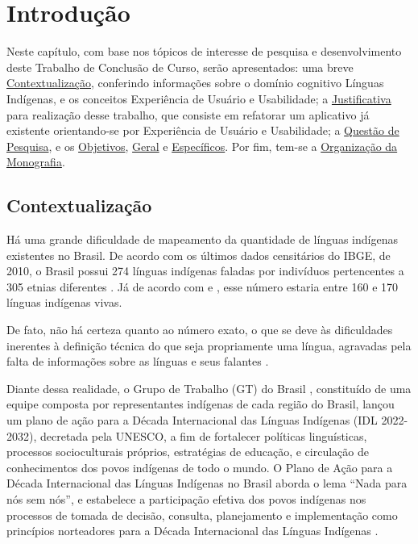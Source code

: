 \chapter[Introdução]{Introdução}

Neste capítulo, com base nos tópicos de interesse de pesquisa e desenvolvimento deste Trabalho de Conclusão de Curso, serão apresentados: uma breve
\hyperref[sec:Contextualização]{Contextualização}, conferindo informações sobre o domínio cognitivo Línguas Indígenas, e os conceitos Experiência de Usuário e
Usabilidade; a \hyperref[sec:Justificativa]{Justificativa} para realização desse trabalho, que consiste em refatorar um aplicativo já existente orientando-se por
Experiência de Usuário e Usabilidade; a \hyperref[sec:QuestaodePesquisa]{Questão de Pesquisa}, e os \hyperref[sec:Objetivos]{Objetivos},
\hyperref[sec:ObjetivoGeral]{Geral} e \hyperref[sec:ObjetivosEspecificos]{Específicos}. Por fim, tem-se a \hyperref[sec:OrganizacaodaMonografia]{Organização da Monografia}.

\section{Contextualização}
\label{sec:Contextualização}

Há uma grande dificuldade de mapeamento da quantidade de línguas indígenas existentes no Brasil. De acordo com os últimos dados censitários do IBGE, de 2010, o Brasil
possui 274 línguas indígenas faladas por indivíduos pertencentes a 305 etnias diferentes \cite{ibge}. Já de acordo com  e \cite{dangelis2014}, esse
número estaria entre 160 e 170 línguas indígenas vivas.

De fato, não há certeza quanto ao número exato, o que se deve às dificuldades inerentes à definição técnica do que seja propriamente uma língua, agravadas pela falta de
informações sobre as línguas e seus falantes \cite{seki2000}.

Diante dessa realidade, o Grupo de Trabalho (GT) do Brasil \cite{gtbrasil2021}, constituído de uma equipe composta por representantes indígenas de cada região do Brasil,
lançou um plano de ação para a Década Internacional das Línguas Indígenas (IDL 2022-2032), decretada pela UNESCO, a fim de fortalecer políticas linguísticas, processos
socioculturais próprios, estratégias de educação, e circulação de conhecimentos dos povos indígenas de todo o mundo. O Plano de Ação para a Década Internacional das
Línguas Indígenas no Brasil aborda o lema “Nada para nós sem nós”, e estabelece a participação efetiva dos povos indígenas nos processos de tomada de decisão, consulta,
planejamento e implementação como princípios norteadores para a Década Internacional das Línguas Indígenas \cite{gtbrasil2021}.

